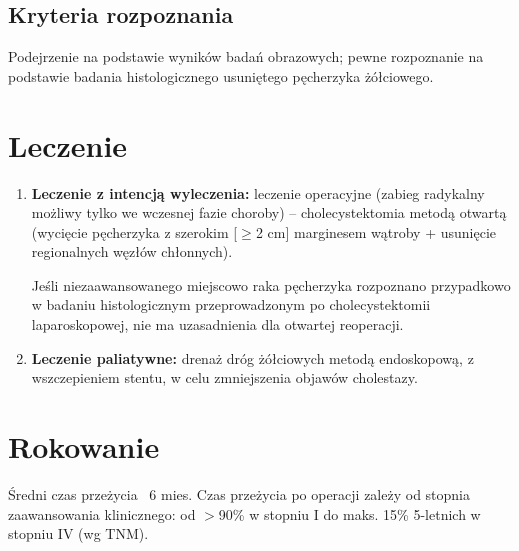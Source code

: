 \subsection{Kryteria rozpoznania}

Podejrzenie na podstawie wyników badań obrazowych; pewne rozpoznanie na podstawie badania histologicznego usuniętego pęcherzyka żółciowego.

\section{Leczenie}

\begin{enumerate}
    \item \textbf{Leczenie z intencją wyleczenia:} leczenie operacyjne (zabieg radykalny możliwy tylko we wczesnej fazie choroby) – cholecystektomia metodą otwartą (wycięcie pęcherzyka z szerokim [$\geq$2 cm] marginesem wątroby + usunięcie regionalnych węzłów chłonnych). 
    
    Jeśli niezaawansowanego miejscowo raka pęcherzyka rozpoznano przypadkowo w badaniu histologicznym przeprowadzonym po cholecystektomii laparoskopowej, nie ma uzasadnienia dla otwartej reoperacji.

    \item \textbf{Leczenie paliatywne:} drenaż dróg żółciowych metodą endoskopową, z wszczepieniem stentu, w celu zmniejszenia objawów cholestazy.
\end{enumerate}

\section{Rokowanie}

Średni czas przeżycia ~6 mies. 
Czas przeżycia po operacji zależy od stopnia zaawansowania klinicznego: od $>$90\% w stopniu I do maks. 15\% 5-letnich w stopniu IV (wg TNM).